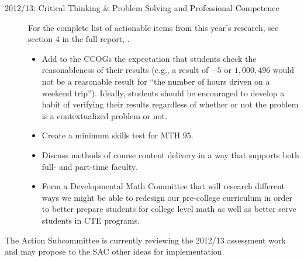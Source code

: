 \begin{description}
	\item[2012/13:  Critical Thinking \& Problem Solving and Professional Competence]

	      For the complete list of actionable items from this year's research, see section 4 in the full report, \cite{annualLASreport2012}.
	      \begin{itemize}
		      \item Add to the CCOGs the expectation that students check the reasonableness of their results (e.g., a result of $-5$ or $1{,}000{,}496$ would not be a reasonable result for ``the number of hours driven on a weekend trip'').
		            Ideally, students should be encouraged to develop a habit of verifying their results regardless of whether or not the problem is a contextualized problem or not.
		      \item Create a minimum skills test for MTH 95.
		      \item Discuss methods of course content delivery in a way that supports both full- and part-time faculty.
		      \item Form a Developmental Math Committee that will research different ways we might be able to redesign our pre-college curriculum in order to better prepare students for college level math as well as better serve students in CTE programs.
	      \end{itemize}

\end{description}

The Action Subcommittee is currently reviewing the 2012/13 assessment work and may propose to the SAC other ideas for implementation.

